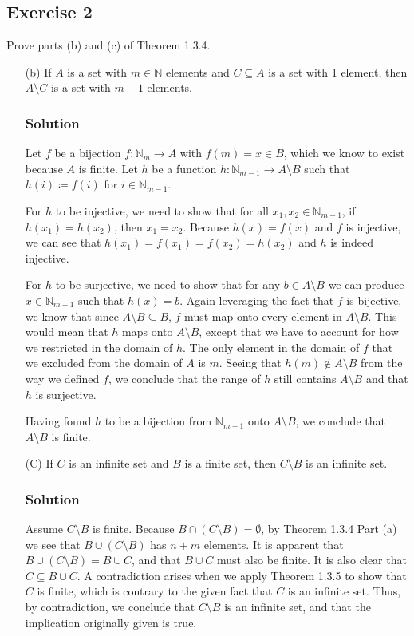 \documentclass[12pt]{article}
\begin{document}
\subsection*{Exercise 2}
Prove parts (b) and (c) of Theorem 1.3.4.
\begin{itemize}
\item[(b)] If $A$ is a set with $m \in \mathbb{N}$ elements and $C \subseteq A$ is a set with 1 element, then $A \setminus C$ is a set with $m - 1$ elements.
\subsubsection*{Solution}
Let $f$ be a bijection $f : \mathbb{N}_m \to A$ with $f(m) = x \in B$, which we know to exist because $A$ is finite.
Let $h$ be a function $h : \mathbb{N}_{m-1} \to A \setminus B$ such that $h(i) \coloneqq f(i)$ for $i \in \mathbb{N}_{m - 1}$.

For $h$ to be injective, we need to show that for all $x_1, x_2 \in \mathbb{N}_{m-1}$, if $h\left(x_1\right) = h\left(x_2\right)$, then $x_1 = x_2$. Because $h(x) = f(x)$ and $f$ is injective, we can see that $h\left(x_1\right) = f\left(x_1\right) = f\left(x_2\right) = h\left(x_2\right)$ and $h$ is indeed injective.

For $h$ to be surjective, we need to show that for any $b \in A \setminus B$ we can produce $x \in \mathbb{N}_{m-1}$ such that $h\left(x\right) = b$. Again leveraging the fact that $f$ is bijective, we know that since $A \setminus B \subseteq B$, $f$ must map onto every element in $A \setminus B$. This would mean that $h$ maps onto $A \setminus B$, except that we have to account for how we restricted in the domain of $h$. The only element in the domain of $f$ that we excluded from the domain of $A$ is $m$. Seeing that $h\left(m\right) \notin A \setminus B$ from the way we defined $f$, we conclude that the range of $h$ still contains $A \setminus B$ and that $h$ is surjective.

Having found $h$ to be a bijection from $\mathbb{N}_{m-1}$ onto $A \setminus B$, we conclude that $A \setminus B$ is finite.

\item[(C)] If $C$ is an infinite set and $B$ is a finite set, then $C \setminus B$ is an infinite set.
\subsubsection*{Solution}
Assume $C \setminus B$ is finite. Because $B \cap \left(C \setminus B\right) = \emptyset$, by Theorem 1.3.4 Part (a) we see that $B \cup \left(C \setminus B\right)$ has $n + m$ elements. It is apparent that $B \cup \left(C \setminus B\right) = B \cup C$, and that $B \cup C$ must also be finite. It is also clear that $C \subseteq B \cup C$. A contradiction arises when we apply Theorem 1.3.5 to show that $C$ is finite, which is contrary to the given fact that $C$ is an infinite set. Thus, by contradiction, we conclude that $C \setminus B$ is an infinite set, and that the implication originally given is true.

\end{itemize}
\end{document}
